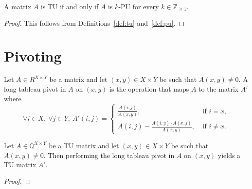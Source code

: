 \begin{lemma}
    \label{lem:tu_iff_all_pu}
    \leanok
    A matrix $A$ is TU if and only if $A$ is $k$-PU for every $k \in \mathbb{Z}_{\geq 1}$.
\end{lemma}

\begin{proof}
    \leanok
    This follows from Definitions~\ref{def:tu} and~\ref{def:pu}.
\end{proof}


\section{Pivoting}


\begin{definition}
    \label{def:ltp}
    \leanok
    Let $A \in R^{X \times Y}$ be a matrix and let $(x, y) \in X \times Y$ be such that $A (x, y) \neq 0$. A long tableau pivot in $A$ on $(x, y)$ is the operation that maps $A$ to the matrix $A'$ where
    \[
        \forall i \in X, \ \forall j \in Y, \ A' (i, j) = \begin{cases}
            \frac{A (i, j)}{A (x, y)}, & \text{ if } i = x, \\
            A (i, j) - \frac{A (i, y) \cdot A (x, j)}{A (x, y)}, & \text{ if } i \neq x.
        \end{cases}
    \]
\end{definition}

\begin{lemma}
    \label{lem:ltp_tu}
    \leanok
    Let $A \in \mathbb{Q}^{X \times Y}$ be a TU matrix and let $(x, y) \in X \times Y$ be such that $A (x, y) \neq 0$. Then performing the long tableau pivot in $A$ on $(x, y)$ yields a TU matrix $A'$.
\end{lemma}

\begin{proof}
    \leanok
    \SeeLean
\end{proof}




